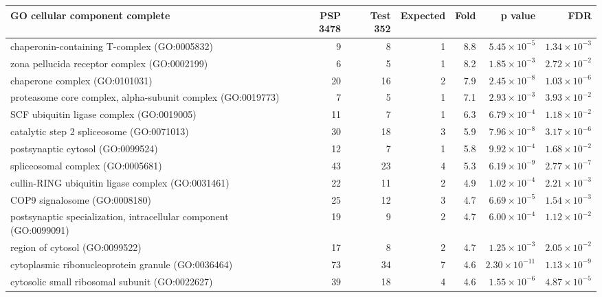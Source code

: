 \begin{table}[ht]
\centering
\begin{adjustbox}{width=\textwidth}
\begin{tabular}{lrrrrrr}
  \hline
GO cellular component complete & PSP 3478 & Test 352 & Expected & Fold & p value & FDR \\ 
  \hline
chaperonin-containing T-complex (GO:0005832) & 9 & 8 & 1 & 8.8 & $5.45 \times 10^{-5}$ & $1.34 \times 10^{-3}$ \\ 
  zona pellucida receptor complex (GO:0002199) & 6 & 5 & 1 & 8.2 & $1.85 \times 10^{-3}$ & $2.72 \times 10^{-2}$ \\ 
  chaperone complex (GO:0101031) & 20 & 16 & 2 & 7.9 & $2.45 \times 10^{-8}$ & $1.03 \times 10^{-6}$ \\ 
  proteasome core complex, alpha-subunit complex (GO:0019773) & 7 & 5 & 1 & 7.1 & $2.93 \times 10^{-3}$ & $3.93 \times 10^{-2}$ \\ 
  SCF ubiquitin ligase complex (GO:0019005) & 11 & 7 & 1 & 6.3 & $6.79 \times 10^{-4}$ & $1.18 \times 10^{-2}$ \\ 
  catalytic step 2 spliceosome (GO:0071013) & 30 & 18 & 3 & 5.9 & $7.96 \times 10^{-8}$ & $3.17 \times 10^{-6}$ \\ 
  postsynaptic cytosol (GO:0099524) & 12 & 7 & 1 & 5.8 & $9.92 \times 10^{-4}$ & $1.68 \times 10^{-2}$ \\ 
  spliceosomal complex (GO:0005681) & 43 & 23 & 4 & 5.3 & $6.19 \times 10^{-9}$ & $2.77 \times 10^{-7}$ \\ 
  cullin-RING ubiquitin ligase complex (GO:0031461) & 22 & 11 & 2 & 4.9 & $1.02 \times 10^{-4}$ & $2.21 \times 10^{-3}$ \\ 
  COP9 signalosome (GO:0008180) & 25 & 12 & 3 & 4.7 & $6.69 \times 10^{-5}$ & $1.54 \times 10^{-3}$ \\ 
  postsynaptic specialization, intracellular component (GO:0099091) & 19 & 9 & 2 & 4.7 & $6.00 \times 10^{-4}$ & $1.12 \times 10^{-2}$ \\ 
  region of cytosol (GO:0099522) & 17 & 8 & 2 & 4.7 & $1.25 \times 10^{-3}$ & $2.05 \times 10^{-2}$ \\ 
  cytoplasmic ribonucleoprotein granule (GO:0036464) & 73 & 34 & 7 & 4.6 & $2.30 \times 10^{-11}$ & $1.13 \times 10^{-9}$ \\ 
  cytosolic small ribosomal subunit (GO:0022627) & 39 & 18 & 4 & 4.6 & $1.55 \times 10^{-6}$ & $4.87 \times 10^{-5}$ \\ 

\end{tabular}
\end{adjustbox}
\end{table}
